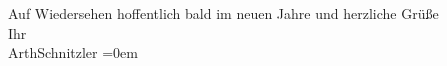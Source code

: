 \pstart
           Auf Wiedersehen hoffentlich bald im neuen Jahre und herzliche Grüße{\\[\baselineskip]}Ihr{\\[\baselineskip]}\spacefill\mbox{ArthSchnitzler}\pend
           \leftskip=0em{}\endnumbering{}  \newcommand{\dateiname}{L02528}\newcommand{\titel}{Arthur Schnitzler an Robert Adam, 23. 12. 1929}\newcommand{\editorInnen}{Martin Anton Müller und Gerd-Hermann Susen}
